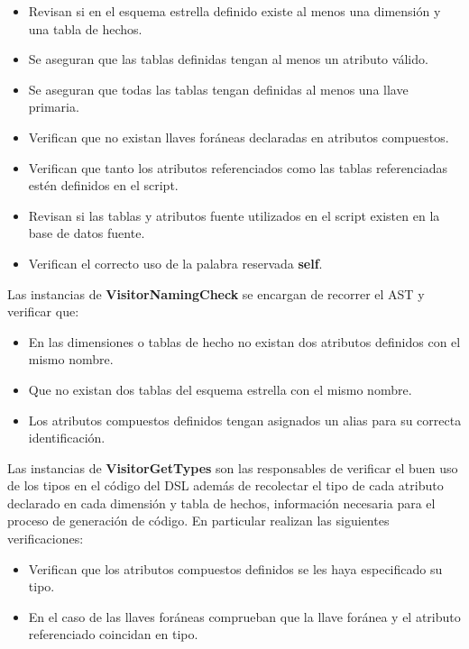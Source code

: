\begin{itemize}
    \item Revisan si en el esquema estrella definido existe al menos una dimensión y una tabla de hechos.
    \item Se aseguran que las tablas definidas tengan al menos un atributo válido.
    \item Se aseguran que todas las tablas tengan definidas al menos una llave primaria.
    \item Verifican que no existan llaves for\'aneas declaradas en atributos compuestos.
    \item Verifican que tanto los atributos referenciados como las tablas referenciadas est\'en definidos en el 
        script.
    \item Revisan si las tablas y atributos fuente utilizados en el script existen en la base de datos fuente.
    \item Verifican el correcto uso de la palabra reservada \textbf{self}.
\end{itemize}

Las instancias de \textbf{VisitorNamingCheck} se encargan de recorrer el AST y verificar que: 

\begin{itemize}
    \item En las dimensiones o tablas de hecho no existan dos atributos definidos con el mismo nombre.
    \item Que no existan dos tablas del esquema estrella con el mismo nombre.
    \item Los atributos compuestos definidos tengan asignados un alias para su correcta identificación.
\end{itemize}

Las instancias de \textbf{VisitorGetTypes} son las responsables de verificar el buen uso de los tipos en el 
código del DSL además de recolectar el tipo de cada atributo declarado en cada dimensión y 
tabla de hechos, 
información necesaria para el proceso de generación de código. En particular realizan 
las siguientes verificaciones: 

\begin{itemize}
    \item Verifican que los atributos compuestos definidos se les haya especificado su tipo.
    \item En el caso de las llaves for\'aneas comprueban que la llave for\'anea y el atributo referenciado 
        coincidan en tipo.
\end{itemize}

